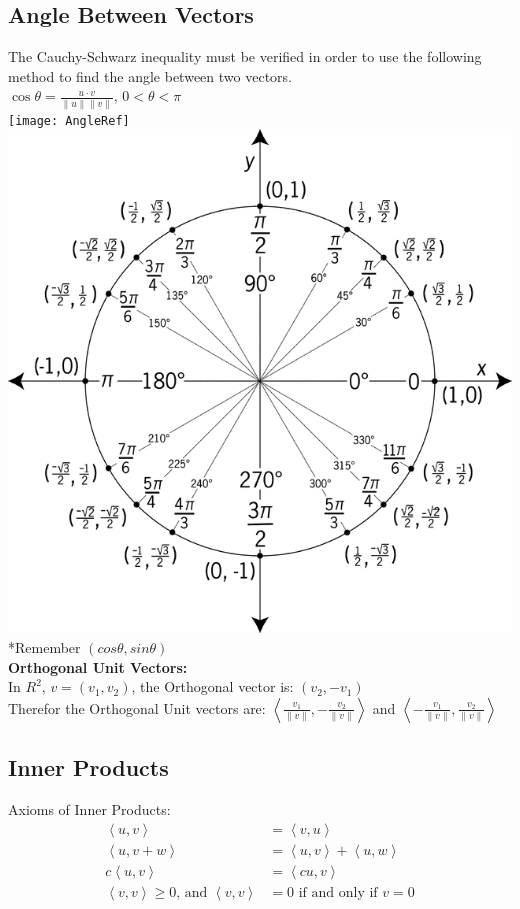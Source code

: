 \documentclass[]{article}
\begin{document}
\subsection{Angle Between Vectors}
The Cauchy-Schwarz inequality must be verified in order to use the following method to find the angle between two vectors. \\
$ \cos\theta = \frac{u \cdot v}{\left\| u \right\| \left\| v \right\|} $,
$ 0 < \theta < \pi$\\

\texttt{[image: AngleRef]}
\includegraphics[width=0.5\linewidth]{UnitCircle} 
*Remember $(cos\theta,sin\theta)$ \\

\textbf{Orthogonal Unit Vectors:} \\
In $R^2$, $v = (v_1, v_2)$, the Orthogonal vector is: $(v_2, −v_1)$ \\
Therefor the Orthogonal Unit vectors are:
$ \left\langle 
	\frac{v_1}{\left\| v\right\| },
  - \frac{v_2}{\left\| v\right\| }
  \right\rangle $ and
$ \left\langle 
  - \frac{v_1}{\left\| v\right\| },
	\frac{v_2}{\left\| v\right\| }
\right\rangle $

\subsection{Inner Products}
Axioms of Inner Products:
\begin{align*}
	\left\langle u,v \right\rangle &= 
	\left\langle v,u \right\rangle \\
	\left\langle u,v+w \right\rangle &= 
	\left\langle u,v \right\rangle + \left\langle u,w \right\rangle \\
	c\left\langle u,v \right\rangle &= 
	\left\langle cu,v \right\rangle \\
	\left\langle v,v \right\rangle \geq 0 \text{, and }
	\left\langle v,v \right\rangle &= 0 
	\text{ if and only if } v=0 \\
\end{align*}
\end{document}
